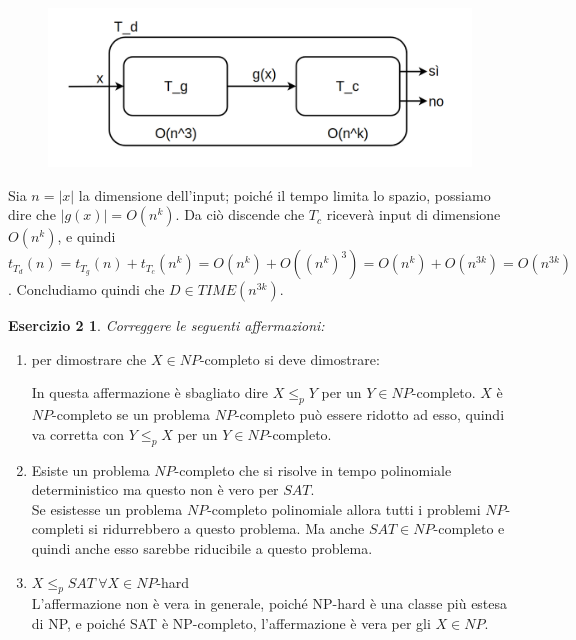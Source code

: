 \begin{figure}[H]
	\centering
	\includegraphics[width=\textwidth]{riduzione-esercizio}
\end{figure}

Sia $n = |x|$ la dimensione dell'input; poiché il tempo limita lo spazio, possiamo dire che $|g(x)| = O(n^k)$. Da ciò discende che $T_c$ riceverà input di dimensione $O(n^k)$, e quindi $t_{T_d}(n) = t_{T_g}(n) + t_{T_c}(n^k) = O(n^k) + O((n^k)^3) = O(n^k) + O(n^{3k}) = O(n^{3k})$. Concludiamo quindi che $D \in TIME(n^{3k})$.

\newtheorem*{exc2}{Esercizio 2}
\begin{exc2}
Correggere le seguenti affermazioni:
\end{exc2}
\begin{enumerate}
			\item per dimostrare che $X \in NP$-completo si deve dimostrare:
				In questa affermazione è sbagliato dire $X \leq_p Y$ per un $Y \in NP$-completo. $X$ è $NP$-completo se un problema $NP$-completo può essere ridotto ad esso, quindi va corretta con $Y \leq_p X$ per un $Y \in NP$-completo.
			
			\item Esiste un problema $NP$-completo che si risolve in tempo polinomiale deterministico ma questo non è vero per $SAT$.\\
			Se esistesse un problema $NP$-completo polinomiale allora tutti i problemi $NP$-completi si ridurrebbero a questo problema. Ma anche $SAT \in NP$-completo e quindi anche esso sarebbe riducibile a questo problema.
						
			\item $X \leq_p SAT \ \forall X \in NP$-hard\\
			L'affermazione non è vera in generale, poiché NP-hard è una classe più estesa di NP, e poiché SAT è NP-completo, l'affermazione è vera per gli $X \in NP$.
		\end{enumerate}


